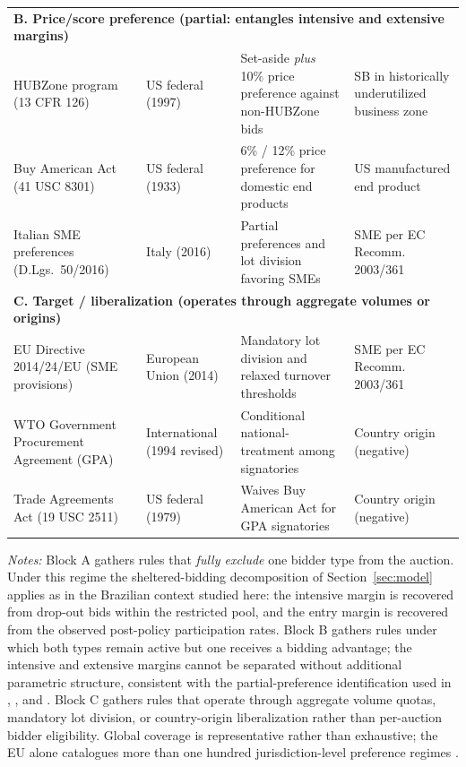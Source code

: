 \begin{table}[p]
\begin{threeparttable}
\begin{tabular}{p{4.6cm}p{2.6cm}p{3.2cm}p{3.6cm}}
\midrule
\multicolumn{4}{l}{\textbf{B. Price/score preference (partial: entangles intensive and extensive margins)}} \\
HUBZone program (13 CFR 126) & US federal (1997) & Set-aside \emph{plus} 10\% price preference against non-HUBZone bids & SB in historically underutilized business zone \\
Buy American Act (41 USC 8301) & US federal (1933) & 6\% / 12\% price preference for domestic end products & US manufactured end product \\
Italian SME preferences (D.Lgs.\ 50/2016) & Italy (2016) & Partial preferences and lot division favoring SMEs & SME per EC Recomm. 2003/361 \\
\midrule
\multicolumn{4}{l}{\textbf{C. Target / liberalization (operates through aggregate volumes or origins)}} \\
EU Directive 2014/24/EU (SME provisions) & European Union (2014) & Mandatory lot division and relaxed turnover thresholds & SME per EC Recomm. 2003/361 \\
WTO Government Procurement Agreement (GPA) & International (1994 revised) & Conditional national-treatment among signatories & Country origin (negative) \\
Trade Agreements Act (19 USC 2511) & US federal (1979) & Waives Buy American Act for GPA signatories & Country origin (negative) \\
\bottomrule
\end{tabular}
\begin{tablenotes}
\footnotesize
\item \textit{Notes:} Block A gathers rules that \emph{fully exclude} one bidder type from the auction. Under this regime the sheltered-bidding decomposition of Section~\ref{sec:model} applies as in the Brazilian context studied here: the intensive margin is recovered from drop-out bids within the restricted pool, and the entry margin is recovered from the observed post-policy participation rates. Block B gathers rules under which both types remain active but one receives a bidding advantage; the intensive and extensive margins cannot be separated without additional parametric structure, consistent with the partial-preference identification used in \citet{marion2007}, \citet{krasnokutskaya2011}, and \citet{atheyseira2011}. Block C gathers rules that operate through aggregate volume quotas, mandatory lot division, or country-origin liberalization rather than per-auction bidder eligibility. Global coverage is representative rather than exhaustive; the EU alone catalogues more than one hundred jurisdiction-level preference regimes \citep{bosio2022}.
\end{tablenotes}
\end{threeparttable}
\end{table}

